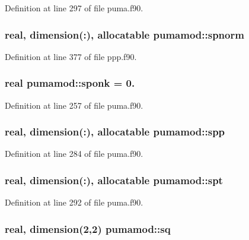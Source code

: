 \-Definition at line 297 of file puma.\-f90.

\hypertarget{classpumamod_a8da7a3798ee3323bf38b6c7b815a3928}{
\subsubsection[{spnorm}]{\setlength{\rightskip}{0pt plus 5cm}real, dimension(\-:), allocatable {\bf pumamod\-::spnorm}}}
\label{classpumamod_a8da7a3798ee3323bf38b6c7b815a3928}


\-Definition at line 377 of file ppp.\-f90.

\hypertarget{classpumamod_ad1a6236311cdfb3949ec1b1c262b59ac}{
\subsubsection[{sponk}]{\setlength{\rightskip}{0pt plus 5cm}real {\bf pumamod\-::sponk} = 0.}}
\label{classpumamod_ad1a6236311cdfb3949ec1b1c262b59ac}


\-Definition at line 257 of file puma.\-f90.

\hypertarget{classpumamod_a8c0d3d0d8eaeee34966b2ed8cdab6880}{
\subsubsection[{spp}]{\setlength{\rightskip}{0pt plus 5cm}real, dimension(\-:), allocatable {\bf pumamod\-::spp}}}
\label{classpumamod_a8c0d3d0d8eaeee34966b2ed8cdab6880}


\-Definition at line 284 of file puma.\-f90.

\hypertarget{classpumamod_a86dd88d1dc1d0d21eeb13c11905d7b66}{
\subsubsection[{spt}]{\setlength{\rightskip}{0pt plus 5cm}real, dimension(\-:), allocatable {\bf pumamod\-::spt}}}
\label{classpumamod_a86dd88d1dc1d0d21eeb13c11905d7b66}


\-Definition at line 292 of file puma.\-f90.

\hypertarget{classpumamod_a94eae8b357e81b00aec6660f112b76b0}{
\subsubsection[{sq}]{\setlength{\rightskip}{0pt plus 5cm}real, dimension(2,2) {\bf pumamod\-::sq}}}
\label{classpumamod_a94eae8b357e81b00aec6660f112b76b0}


